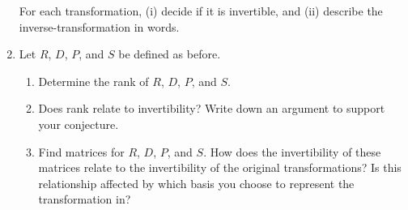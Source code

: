 \documentclass[red]{tutorial}
\theoremstyle{definition}
\theoremstyle{theorem}
\begin{document}
\begin{tutorial}
\begin{enumerate}
			For each transformation, (i) decide if it is invertible, and (ii) describe the inverse-transformation in words.
		\item Let $R$, $D$, $P$, and $S$ be defined as before.
			\begin{enumerate}
				\item Determine the rank of $R$, $D$, $P$, and $S$.
				\item Does rank relate to invertibility? Write down an argument to support your conjecture.
				\item Find matrices for $R$, $D$, $P$, and $S$. How does the invertibility of these
					matrices relate to the invertibility of the original transformations?
					Is this relationship affected by which basis you choose to represent the
					transformation in?
			\end{enumerate}
	\end{enumerate}



	\end{tutorial}
\end{document}
